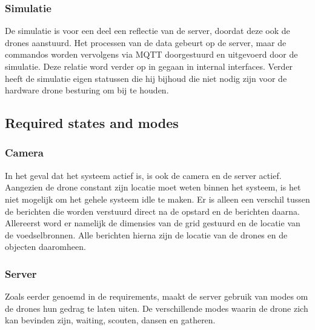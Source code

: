 \subsubsection*{Simulatie}
De simulatie is voor een deel een reflectie van de server, doordat deze ook de drones aanstuurd. Het processen van de data gebeurt op de server,
maar de commandos worden vervolgens via MQTT doorgestuurd en uitgevoerd door de simulatie. Deze relatie word verder op in gegaan in internal interfaces.
Verder heeft de simulatie eigen statussen die hij bijhoud die niet nodig zijn voor de hardware drone besturing om bij te houden. 
 



\subsection{Required states and modes}

\subsubsection*{Camera}
In het geval dat het systeem actief is, is ook de camera en de server actief.
Aangezien de drone constant zijn locatie moet weten binnen het systeem, is het niet mogelijk om het gehele systeem 
idle te maken. Er is alleen een verschil tussen de berichten die worden verstuurd direct na de opstard en de berichten daarna.
Allereerst word er namelijk de dimensies van de grid gestuurd en de locatie van de voedselbronnen. 
Alle berichten hierna zijn de locatie van de drones en de objecten daaromheen.

\subsubsection*{Server}
Zoals eerder genoemd in de requirements, maakt de server gebruik van modes om de drones hun gedrag te laten uiten.
De verschillende modes waarin de drone zich kan bevinden zijn, waiting, scouten, dansen en gatheren. 


